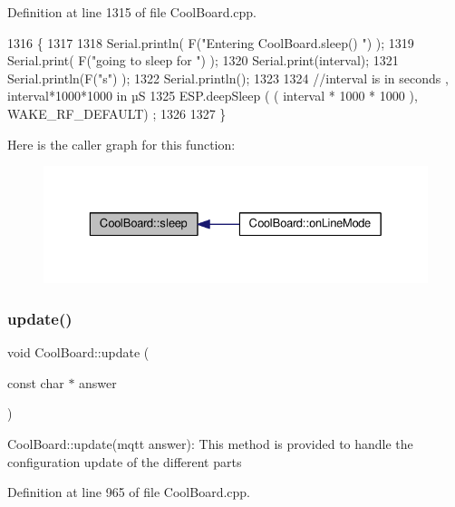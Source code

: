 Definition at line 1315 of file Cool\+Board.\+cpp.


\begin{DoxyCode}
1316 \{
1317 
1318     Serial.println( F(\textcolor{stringliteral}{"Entering CoolBoard.sleep() "}) );
1319     Serial.print( F(\textcolor{stringliteral}{"going to sleep for "}) );
1320     Serial.print(interval);
1321     Serial.println(F(\textcolor{stringliteral}{"s"}) );
1322     Serial.println();
1323     
1324     \textcolor{comment}{//interval is in seconds , interval*1000*1000 in µS}
1325     ESP.deepSleep ( ( interval * 1000 * 1000 ), WAKE\_RF\_DEFAULT) ;
1326 
1327 \}
\end{DoxyCode}
Here is the caller graph for this function\+:\nopagebreak
\begin{figure}[H]
\begin{center}
\leavevmode
\includegraphics[width=329pt]{d7/df9/class_cool_board_a069952cdcb2e7f68518aa429eceadb6e_icgraph}
\end{center}
\end{figure}
\mbox{\label{class_cool_board_a8612756d3f73198cdde857a66f0fe690}} 
\subsubsection{\texorpdfstring{update()}{update()}}
{\footnotesize\ttfamily void Cool\+Board\+::update (\begin{DoxyParamCaption}\item[{const char $\ast$}]{answer }\end{DoxyParamCaption})}

Cool\+Board\+::update(mqtt answer)\+: This method is provided to handle the configuration update of the different parts 

Definition at line 965 of file Cool\+Board.\+cpp.


